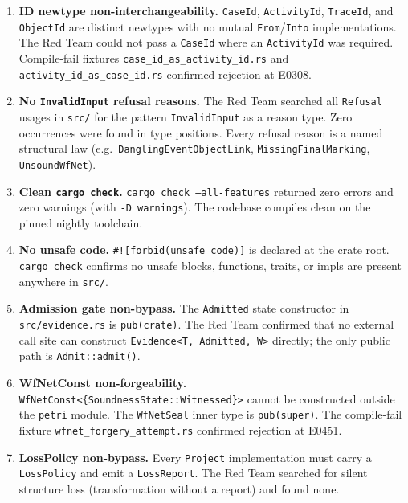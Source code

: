 \begin{enumerate}
  \item \textbf{ID newtype non-interchangeability.}
    \texttt{CaseId}, \texttt{ActivityId}, \texttt{TraceId}, and
    \texttt{ObjectId} are distinct newtypes with no mutual \texttt{From}/\texttt{Into}
    implementations. The Red Team could not pass a \texttt{CaseId} where an
    \texttt{ActivityId} was required. Compile-fail fixtures
    \texttt{case\_id\_as\_activity\_id.rs} and
    \texttt{activity\_id\_as\_case\_id.rs} confirmed rejection at E0308.

  \item \textbf{No \texttt{InvalidInput} refusal reasons.}
    The Red Team searched all \texttt{Refusal} usages in \texttt{src/} for
    the pattern \texttt{InvalidInput} as a reason type. Zero occurrences were
    found in type positions. Every refusal reason is a named structural law
    (e.g.\ \texttt{DanglingEventObjectLink}, \texttt{MissingFinalMarking},
    \texttt{UnsoundWfNet}).

  \item \textbf{Clean \texttt{cargo check}.}
    \texttt{cargo check --all-features} returned zero errors and zero warnings
    (with \texttt{-D warnings}). The codebase compiles clean on the pinned
    nightly toolchain.

  \item \textbf{No unsafe code.}
    \texttt{\#![forbid(unsafe\_code)]} is declared at the crate root.
    \texttt{cargo check} confirms no unsafe blocks, functions, traits, or
    impls are present anywhere in \texttt{src/}.

  \item \textbf{Admission gate non-bypass.}
    The \texttt{Admitted} state constructor in \texttt{src/evidence.rs} is
    \texttt{pub(crate)}. The Red Team confirmed that no external call site
    can construct \texttt{Evidence<T, Admitted, W>} directly; the only
    public path is \texttt{Admit::admit()}.

  \item \textbf{WfNetConst non-forgeability.}
    \texttt{WfNetConst<\{SoundnessState::Witnessed\}>} cannot be constructed
    outside the \texttt{petri} module. The \texttt{WfNetSeal} inner type is
    \texttt{pub(super)}. The compile-fail fixture
    \texttt{wfnet\_forgery\_attempt.rs} confirmed rejection at E0451.

  \item \textbf{LossPolicy non-bypass.}
    Every \texttt{Project} implementation must carry a \texttt{LossPolicy}
    and emit a \texttt{LossReport}. The Red Team searched for silent
    structure loss (transformation without a report) and found none.
\end{enumerate}

